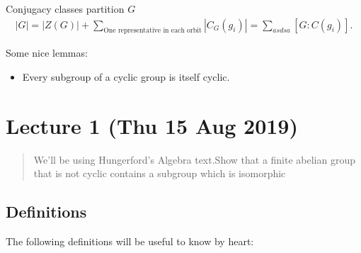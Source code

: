 
Conjugacy classes partition \(G\) \begin{align*}
|G|=|Z(G)| + \sum_{\text{One representative in each orbit}} |C_{G}\left(g_{i}\right) |
= \sum_{asdsa} [G: C(g_{i}) ]
.\end{align*} 

Some nice lemmas:

\begin{itemize}
\tightlist
\item
  Every subgroup of a cyclic group is itself cyclic.
\end{itemize}

\hypertarget{lecture-1-thu-15-aug-2019}{%
\section{Lecture 1 (Thu 15 Aug 2019)}\label{lecture-1-thu-15-aug-2019}}

\begin{quote}
We'll be using Hungerford's Algebra text.Show that a finite abelian
group that is not cyclic contains a subgroup which is isomorphic
\end{quote}

\hypertarget{definitions}{%
\subsection{Definitions}\label{definitions}}

The following definitions will be useful to know by heart:

